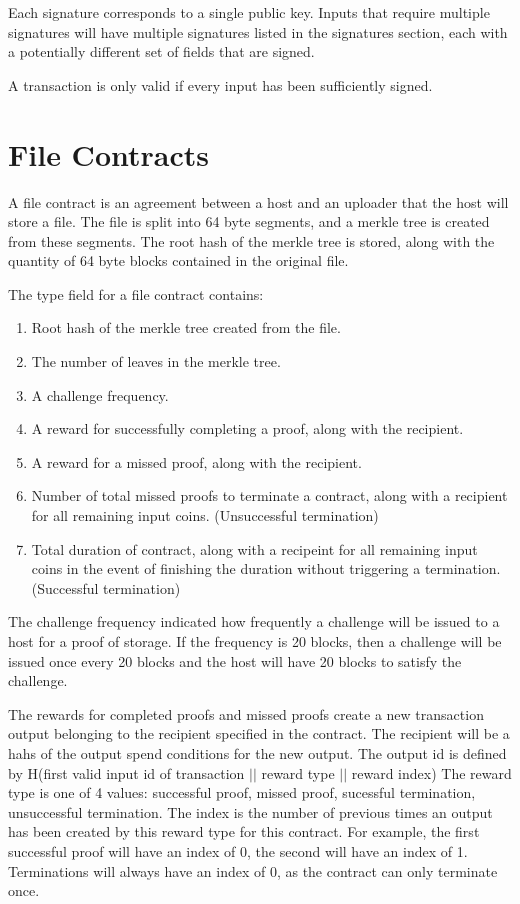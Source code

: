 \documentclass[twocolumn]{article}
\begin{document}
Each signature corresponds to a single public key.
Inputs that require multiple signatures will have multiple signatures listed in the signatures section, each with a potentially different set of fields that are signed.

A transaction is only valid if every input has been sufficiently signed.

\section{File Contracts}
A file contract is an agreement between a host and an uploader that the host will store a file.
The file is split into 64 byte segments, and a merkle tree is created from these segments.
The root hash of the merkle tree is stored, along with the quantity of 64 byte blocks contained in the original file.

The type field for a file contract contains:
\begin{enumerate}
	\item Root hash of the merkle tree created from the file.
	\item The number of leaves in the merkle tree.
	\item A challenge frequency.
	\item A reward for successfully completing a proof, along with the recipient.
	\item A reward for a missed proof, along with the recipient.
	\item Number of total missed proofs to terminate a contract, along with a recipient for all remaining input coins. (Unsuccessful termination)
	\item Total duration of contract, along with a recipeint for all remaining input coins in the event of finishing the duration without triggering a termination. (Successful termination)
\end{enumerate}

The challenge frequency indicated how frequently a challenge will be issued to a host for a proof of storage.
If the frequency is 20 blocks, then a challenge will be issued once every 20 blocks and the host will have 20 blocks to satisfy the challenge.

The rewards for completed proofs and missed proofs create a new transaction output belonging to the recipient specified in the contract.
The recipient will be a hahs of the output spend conditions for the new output.
The output id is defined by H(first valid input id of transaction $||$ reward type $||$ reward index)
The reward type is one of 4 values: successful proof, missed proof, sucessful termination, unsuccessful termination.
The index is the number of previous times an output has been created by this reward type for this contract.
For example, the first successful proof will have an index of 0, the second will have an index of 1.
Terminations will always have an index of 0, as the contract can only terminate once.
\end{document}
